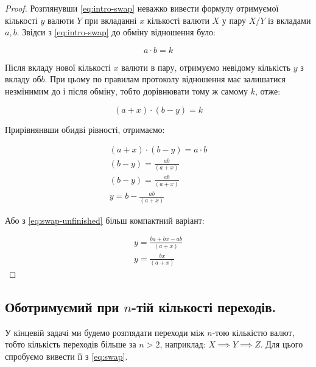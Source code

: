 \documentclass[a4paper, 11pt]{article}
\newcommand{\tqs}{\textquotesingle}
\begin{document}
\begin{proof} Розглянувши \eqref{eq:intro-swap} неважко вивести формулу
отримуємої кількості \(y\) валюти \(Y\) при вкладанні \(x\) кількості валюти
\(X\) у пару \(X/Y\) із вкладами \(a, b\). Звідси з \eqref{eq:intro-swap} до
обміну відношення було:

\begin{equation*}
a \cdot b = k
\end{equation*}

Після вкладу нової кількості \(x\) валюти в пару, отримуємо невідому кількість
\(y\) з вкладу об \(b\). При цьому по правилам протоколу відношення має
залишатися незмінимим до і після обміну, тобто дорівнювати тому ж самому \(k\),
отже:

\begin{equation*}
(a + x) \cdot (b - y) = k
\end{equation*}

Прирівнянвши обидві рівності, отримаємо:

\begin{equation}\label{eq:swap-unfinished}
\begin{aligned}
(a + x) \cdot (b - y) = a \cdot b \\
(b - y) = \frac{a b}{(a + x)} \\
(b - y) = \frac{a b}{(a + x)} \\
y = b - \frac{a b}{(a + x)}
\end{aligned}
\end{equation}

Або з \eqref{eq:swap-unfinished} більш компактний варіант:

\begin{equation}
\begin{aligned}
y = \frac{ba + bx -  a b}{(a + x)} \\
y = \frac{bx}{(a + x)}
\end{aligned}
\end{equation}
\end{proof}

\subsection{Об отримуємий при \(n\)-тій кількості переходів.}

У кінцевій задачі ми будемо розглядати переходи між \(n\)-тою кількістю валют,
тобто кількість переходів більше за \(n > 2\), наприклад: \(X \implies Y
\implies Z\). Для цього спробуємо вивести її з \eqref{eq:swap}.
\end{document}
